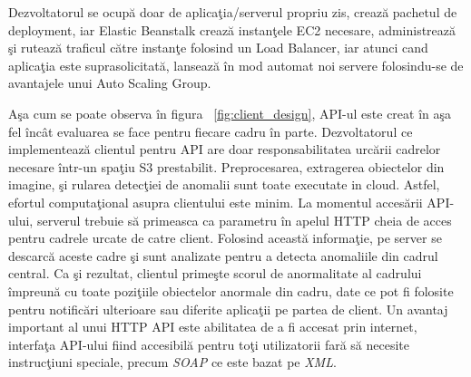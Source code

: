 \documentclass[a4paper,12pt]{report}
\begin{document}
Dezvoltatorul se ocupă doar de aplicaţia/serverul propriu zis, crează pachetul de deployment, iar Elastic Beanstalk crează instanţele EC2 necesare, administrează şi rutează traficul către instanţe folosind un Load Balancer, iar atunci cand aplicaţia este suprasolicitată, lansează în mod automat noi servere folosindu-se de avantajele unui Auto Scaling Group.
\par Aşa cum se poate observa în figura ~\ref{fig:client_design}, API-ul este creat în aşa fel încât evaluarea se face pentru fiecare cadru în parte. Dezvoltatorul ce implementează clientul pentru API are doar responsabilitatea urcării cadrelor necesare într-un spaţiu S3 prestabilit. Preprocesarea, extragerea obiectelor din imagine, şi rularea detecţiei de anomalii sunt toate executate in cloud. Astfel, efortul computaţional asupra clientului este minim. La momentul accesării API-ului, serverul trebuie să primeasca ca parametru în apelul HTTP cheia de acces pentru cadrele urcate de catre client. Folosind această informaţie, pe server se descarcă aceste cadre şi sunt analizate pentru a detecta anomaliile din cadrul central. Ca şi rezultat, clientul primeşte scorul de anormalitate al cadrului împreună cu toate poziţiile obiectelor anormale din cadru, date ce pot fi folosite pentru notificări ulterioare sau diferite aplicaţii pe partea de client. Un avantaj important al unui HTTP API este abilitatea de a fi accesat prin internet, interfaţa API-ului fiind accesibilă pentru toţi utilizatorii fară să necesite instrucţiuni speciale, precum \emph{SOAP} ce este bazat pe \emph{XML}.
\end{document}
